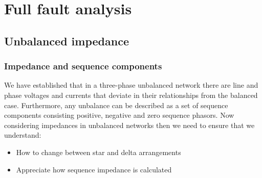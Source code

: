\chapter{Full fault analysis}
\section{Unbalanced impedance}
\subsection{Impedance and sequence components}
We have established that in a three-phase unbalanced network there are line and phase voltages and currents that deviate in their relationships from the balanced case. Furthermore, any unbalance can be described as a set of sequence components consisting positive, negative and zero sequence phasors. Now considering impedances in unbalanced networks then we need to ensure that we understand:
\begin{itemize}
	\item How to change between star and delta arrangements
	\item Appreciate how sequence impedance is calculated
\end{itemize}
